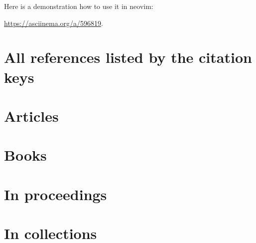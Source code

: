 \documentclass[a4paper,11pt]{article}
\begin{document}
Here is a demonstration how to use it in neovim:
\begin{center}
  \url{https://asciinema.org/a/596819}.
\end{center}






\section{All references listed by the citation keys}

\citeall

\section{Articles}%
\label{sec:Articles}

\printbibliography[type=article,title={Articles}]
\section{Books}%
\label{sec:Books}

\printbibliography[type=book,title={Books}]

\section{In proceedings}%
\label{sec:In proceedings}

\printbibliography[type=inproceedings,title={In proceedings}]

\section{In collections}%
\label{sec:In collections}

\printbibliography[type=incollection,title={In collection}]

\end{document}
